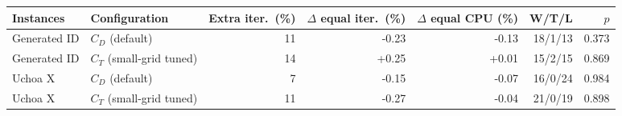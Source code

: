\begin{tabular}{llrrrrr}
\toprule
Instances & Configuration & Extra iter.\ (\%) & $\Delta$ equal iter.\ (\%) & $\Delta$ equal CPU (\%) & W/T/L & $p$ \\
\midrule
Generated ID & $C_D$ (default) & 11 & -0.23 & -0.13 & 18/1/13 & 0.373 \\
Generated ID & $C_T$ (small-grid tuned) & 14 & +0.25 & +0.01 & 15/2/15 & 0.869 \\
Uchoa X & $C_D$ (default) & 7 & -0.15 & -0.07 & 16/0/24 & 0.984 \\
Uchoa X & $C_T$ (small-grid tuned) & 11 & -0.27 & -0.04 & 21/0/19 & 0.898 \\
\bottomrule
\end{tabular}
